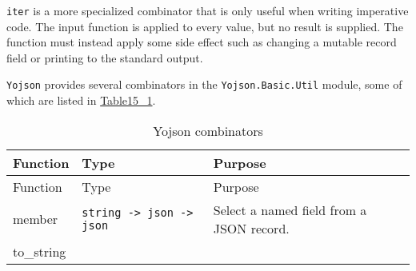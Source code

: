 \passthrough{\lstinline!iter!} is a more specialized combinator that is
only useful when writing imperative code. The input function is applied
to every value, but no result is supplied. The function must instead
apply some side effect such as changing a mutable record field or
printing to the standard output.

\passthrough{\lstinline!Yojson!} provides several combinators in the
\passthrough{\lstinline!Yojson.Basic.Util!} module, some of which are
listed in \href{json.html\#table15_1}{Table15\_1}.

\hypertarget{table15_1}{}
\begin{longtable}[]{@{}lll@{}}
\caption{Yojson combinators}\tabularnewline
\toprule
\begin{minipage}[b]{0.36\columnwidth}\raggedright
Function\strut
\end{minipage} & \begin{minipage}[b]{0.24\columnwidth}\raggedright
Type\strut
\end{minipage} & \begin{minipage}[b]{0.32\columnwidth}\raggedright
Purpose\strut
\end{minipage}\tabularnewline
\midrule
\endfirsthead
\toprule
\begin{minipage}[b]{0.36\columnwidth}\raggedright
Function\strut
\end{minipage} & \begin{minipage}[b]{0.24\columnwidth}\raggedright
Type\strut
\end{minipage} & \begin{minipage}[b]{0.32\columnwidth}\raggedright
Purpose\strut
\end{minipage}\tabularnewline
\midrule
\endhead
\begin{minipage}[t]{0.36\columnwidth}\raggedright
member\strut
\end{minipage} & \begin{minipage}[t]{0.24\columnwidth}\raggedright
\passthrough{\lstinline!string -> json -> json!}\strut
\end{minipage} & \begin{minipage}[t]{0.32\columnwidth}\raggedright
Select a named field from a JSON record.\strut
\end{minipage}\tabularnewline
\begin{minipage}[t]{0.36\columnwidth}\raggedright
to\_string\strut
\end{minipage} & \begin{minipage}[t]{0.24\columnwidth}\raggedright

\end{minipage}
\end{longtable}
